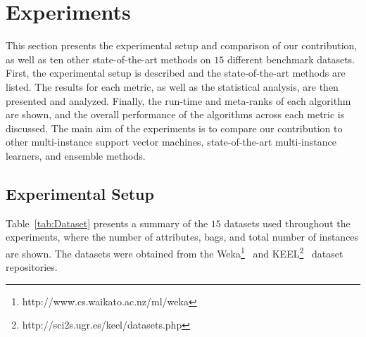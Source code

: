 \documentclass[preprint,12pt]{elsarticle}
\begin{document}
\section{Experiments}\label{sec:experiments}
This section presents the experimental setup and comparison of our contribution, as well as ten other state-of-the-art methods on $15$ different benchmark datasets. First, the experimental setup is described and the state-of-the-art methods are listed. The results for each metric, as well as the statistical analysis, are then presented and analyzed. Finally, the run-time and meta-ranks of each algorithm are shown, and the overall performance of the algorithms across each metric is discussed. The main aim of the experiments is to compare our contribution to other multi-instance support vector machines, state-of-the-art multi-instance learners, and ensemble methods. 

\subsection{Experimental Setup}
Table~\ref{tab:Dataset} presents a summary of the $15$ datasets used throughout the experiments, where the number of attributes, bags, and total number of instances are shown. The datasets were obtained from the Weka\footnote{http://www.cs.waikato.ac.nz/ml/weka}~\citep{Hall2009} and KEEL\footnote{http://sci2s.ugr.es/keel/datasets.php}~\citep{Alca2011} dataset repositories. 
\end{document}
